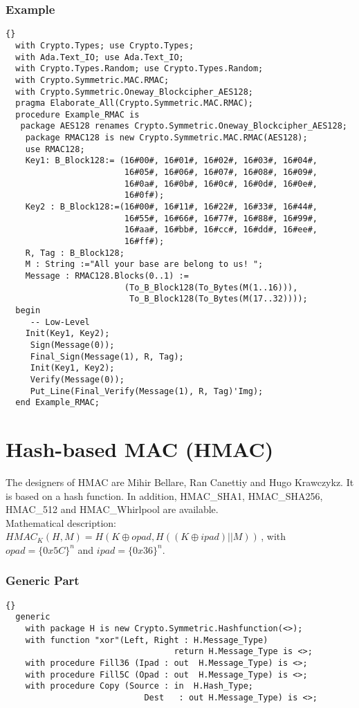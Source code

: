 \subsubsection*{Example}
\begin{lstlisting}{}
  with Crypto.Types; use Crypto.Types;
  with Ada.Text_IO; use Ada.Text_IO;
  with Crypto.Types.Random; use Crypto.Types.Random;
  with Crypto.Symmetric.MAC.RMAC;
  with Crypto.Symmetric.Oneway_Blockcipher_AES128;
  pragma Elaborate_All(Crypto.Symmetric.MAC.RMAC);
  procedure Example_RMAC is
   package AES128 renames Crypto.Symmetric.Oneway_Blockcipher_AES128;
    package RMAC128 is new Crypto.Symmetric.MAC.RMAC(AES128);
    use RMAC128;
    Key1: B_Block128:= (16#00#, 16#01#, 16#02#, 16#03#, 16#04#,
                        16#05#, 16#06#, 16#07#, 16#08#, 16#09#,
                        16#0a#, 16#0b#, 16#0c#, 16#0d#, 16#0e#, 
                        16#0f#);
    Key2 : B_Block128:=(16#00#, 16#11#, 16#22#, 16#33#, 16#44#,
                        16#55#, 16#66#, 16#77#, 16#88#, 16#99#,
                        16#aa#, 16#bb#, 16#cc#, 16#dd#, 16#ee#, 
                        16#ff#);
    R, Tag : B_Block128;
    M : String :="All your base are belong to us! ";
    Message : RMAC128.Blocks(0..1) := 
                        (To_B_Block128(To_Bytes(M(1..16))),		
                         To_B_Block128(To_Bytes(M(17..32))));
  begin
     -- Low-Level
    Init(Key1, Key2);
  	 Sign(Message(0));
  	 Final_Sign(Message(1), R, Tag);
 	 Init(Key1, Key2);
  	 Verify(Message(0));
  	 Put_Line(Final_Verify(Message(1), R, Tag)'Img);
  end Example_RMAC;
\end{lstlisting}
\section{Hash-based MAC (HMAC)}
The designers of HMAC are Mihir Bellare, Ran Canettiy and Hugo Krawczykz. It is based on a hash function. In addition, HMAC\_SHA1, HMAC\_SHA256, HMAC\_512 and HMAC\_Whir\-lpool are available.\\
Mathematical description: $HMAC_K(H,M)=H(K\oplus opad,H((K\oplus ipad)||M))$\,, with $opad=\{0x5C\}^n$ and $ipad=\{0x36\}^n$.
\subsubsection*{Generic Part}
\begin{lstlisting}{}
  generic
    with package H is new Crypto.Symmetric.Hashfunction(<>);
    with function "xor"(Left, Right : H.Message_Type) 
      					          return H.Message_Type is <>;
    with procedure Fill36 (Ipad : out  H.Message_Type) is <>;
    with procedure Fill5C (Opad : out  H.Message_Type) is <>;
    with procedure Copy (Source : in  H.Hash_Type; 
      					    Dest   : out H.Message_Type) is <>;
\end{lstlisting}

